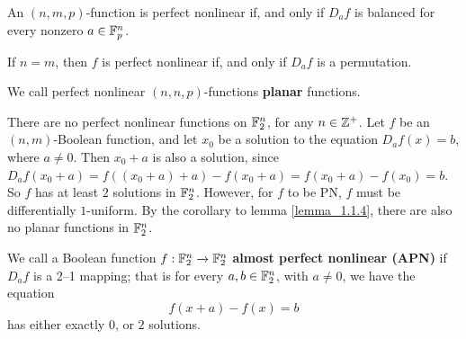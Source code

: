 \begin{lemma}\label{lemma_1.1.4}
  An $(n,m,p)$-function is perfect nonlinear if, and only if $D_a{f}$
  is balanced for every nonzero $a \in \mathbb{F}_p^n$.
\end{lemma}
\begin{corollary}
  If $n=m$, then $f$ is perfect nonlinear if, and only if $D_a{f}$ is
  a permutation.
\end{corollary}

\begin{definition}
  We call perfect nonlinear $(n,n,p)$-functions \textbf{planar}
  functions.
\end{definition}

\begin{example}
  There are no perfect nonlinear functions on $\mathbb{F}_2^n$, for any $n
  \in \mathbb{Z}^+$. Let $f$ be an $(n,m)$-Boolean function, and let $x_0$ be
  a solution to the equation $D_a{f(x)}=b$, where $a \neq 0$. Then
  $x_0+a$ is also a solution, since $D_a{f(x_0+a)}=f((x_0+a)+a)-
  f(x_0+a)=f(x_0+a)-f(x_0)=b$. So $f$ has at least $2$ solutions in
  $\mathbb{F}_2^n$. However, for  $f$ to be PN, $f$ must be differentially
  $1$-uniform. By the corollary to lemma \ref{lemma_1.1.4}, there are
  also no planar functions in $\mathbb{F}_2^n$.
\end{example}

\begin{definition}
  We call a Boolean function $f:\mathbb{F}_2^n \xrightarrow{} \mathbb{F}_2^n$
  \textbf{almost perfect nonlinear (APN)} if $D_a{f}$ is a 2--1
  mapping; that is for every $a,b \in \mathbb{F}_2^n$, with $a \neq 0$, we
  have the equation
  \begin{equation*}
    f(x+a)-f(x)=b
  \end{equation*}
  has either exactly $0$, or  $2$ solutions.
\end{definition}

